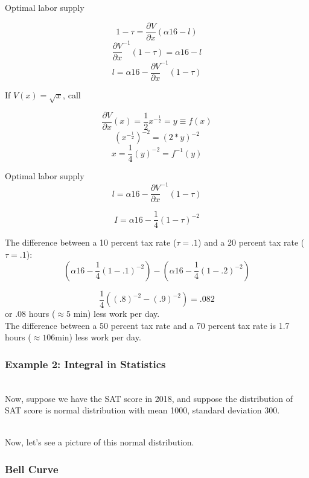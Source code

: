 \documentclass{beamer}
\numberwithin{equation}{section}
\begin{document}
\begin{frame}{Optimal labor supply}

$$1 - \tau = \frac{\partial V } {\partial x}(\alpha 16 - l)$$\pause
$$\frac{\partial V } {\partial x}^{-1}(1 - \tau)=\alpha 16 -l$$\pause
$$l=\alpha 16 - \frac{\partial V } {\partial x}^{-1}(1 - \tau)$$\pause


If $V(x)=\sqrt{x}$, call \pause  

$$\frac{\partial V } {\partial x}(x)=\frac{1}{2}x^{-\frac{1}{2}}=y\equiv f(x)$$\pause 
$$(x^{-\frac{1}{2}})^{-2}=(2*y)^{-2}$$\pause 
$$x=\frac{1}{4}(y)^{-2}=f^{-1}(y)$$




\end{frame}

\begin{frame}{Optimal labor supply}
$$l=\alpha 16 - \frac{\partial V } {\partial x}^{-1}(1 - \tau)$$\pause

$$I = \alpha16 - \frac{1}{4}(1 - \tau)^{-2}$$\pause


The difference between a 10 percent tax rate ($\tau=.1$) and a 20 percent tax rate ($\tau=.1$):
$$(\alpha16 - \frac{1}{4}(1 - .1)^{-2})-(\alpha16 - \frac{1}{4}(1 - .2)^{-2})$$

$$\frac{1}{4}((.8)^{-2}-(.9)^{-2})=.082$$
or .08 hours ($\approx 5$ min) less work per day.\\ \pause
The difference between a 50 percent tax rate and a 70 percent tax rate is 1.7 hours ($\approx  106$min) less work per day.
\end{frame}

\begin{frame}
\frametitle{Example 2: Integral in Statistics}


\ \\Now, suppose we have the SAT score in 2018, and suppose the distribution of SAT score is normal distribution with mean 1000, standard deviation 300. \pause

\ \\Now, let's see a picture of this normal distribution.

\end{frame}



\begin{frame}
\frametitle{Bell Curve}

\begin{center}
\end{center}

\end{frame}
\end{document}
